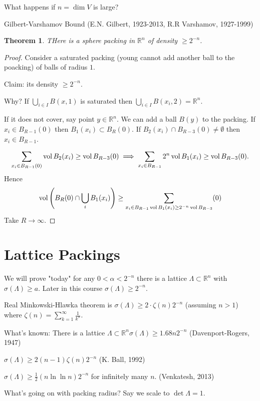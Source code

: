 \documentclass{report}
\newcommand{\R}{\mathbb{R}}
\newtheorem{theorem}{Theorem}[section]
\theoremstyle{definition}
\theoremstyle{remark}
\numberwithin{equation}{section}
\begin{document}
What happens if $n = \dim V$ is large?

Gilbert-Varshamov Bound (E.N. Gilbert, 1923-2013, R.R Varshamov, 1927-1999)
\begin{theorem}
    THere is a sphere packing in $\R^n$ of density $\geq 2^{-n}$.
\end{theorem}
\begin{proof}
    Consider a saturated packing (young cannot add another ball to the poacking) of balls of radius $1$.

    Claim: its density $\geq 2^{-n}$.

    Why? If $\bigcup_{i \in I} B(x, 1)$ is saturated then $\bigcup_{i \in I} B(x_i, 2) = \R^n$.

    If it does not cover, say point $y \in \R^n$. We can add a ball $B(y)$ to the packing. If $x_i \in  B_{R-1}(0)$ then $B_1(x_i) \subset B_R(0)$. If $B_2(x_i) \cap B_{R-3}(0) \neq \emptyset$ then $x_i \in B_{R-1}$.

    \[\sum_{x_i \in B_{R-1}(0)}\operatorname{vol} B_2(x_i) \geq \operatorname{vol} B_{R-3}(0) \implies \sum_{x_i \in B_{R-1}}2^n\operatorname{vol} B_1(x_i) \geq \operatorname{vol} B_{R-3}(0).\]
    Hence \[\operatorname{vol} \left(B_R(0) \cap \bigcup_{i} B_1(x_i)\right) \geq \sum_{x_i \in B_{R-1} \operatorname{vol} B_1(x_i) \geq 2^{-n}\operatorname{vol} B_{R-3}}(0)\]
    Take $R \to \infty$.
\end{proof}

\section{Lattice Packings}
We will prove "today" for any $0 < \alpha < 2^{-n}$ there is a lattice $\Lambda \subset  \R^n$ with $\sigma(\Lambda) \geq a$. Later in this course $\sigma (\Lambda) \geq 2^{-n}$.

Real Minkowski-Hlawka theorem is $\sigma(\Lambda) \geq 2 \cdot \zeta(n)2^{-n}$ (assuming $n > 1$) where $\zeta(n) = \sum_{k=1}^\infty \frac{1}{k^n}$.

What's known:
There is a lattice $\Lambda \subset \R^n \sigma(\Lambda) \geq 1.68n2^{-n}$ (Davenport-Rogers, 1947)

$\sigma(\Lambda) \geq 2(n-1)\zeta(n)2^{-n}$ (K. Ball, 1992)

$\sigma(\Lambda) \geq \frac{1}{2}(n \ln \ln n) 2^{-n}$ for infinitely many $n$. (Venkatesh, 2013)

What's going on with packing radius? Say we scale to $\det \Lambda = 1$.
\end{document}
